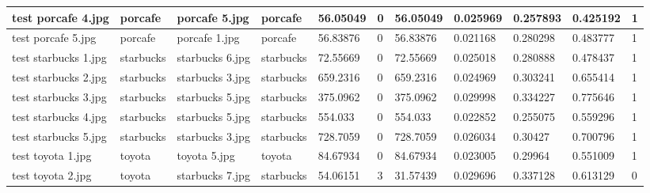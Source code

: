 \begin{landscape}
\begin{longtable}{|p{2cm}|p{1.5cm}|p{2cm}|p{1.5cm}|p{2cm}|p{1cm}|p{2cm}|p{2cm}|p{2cm}|p{2cm}|p{1cm}|}
		test porcafe 4.jpg   & porcafe          & porcafe 5.jpg         & porcafe                     & 56.05049              & 0                       & 56.05049                   & 0.025969              & 0.257893              & 0.425192                 & 1                \\ \hline
		test porcafe 5.jpg   & porcafe          & porcafe 1.jpg         & porcafe                     & 56.83876              & 0                       & 56.83876                   & 0.021168              & 0.280298              & 0.483777                 & 1                \\ \hline
		test starbucks 1.jpg & starbucks        & starbucks 6.jpg       & starbucks                   & 72.55669              & 0                       & 72.55669                   & 0.025018              & 0.280888              & 0.478437                 & 1                \\ \hline
		test starbucks 2.jpg & starbucks        & starbucks 3.jpg       & starbucks                   & 659.2316              & 0                       & 659.2316                   & 0.024969              & 0.303241              & 0.655414                 & 1                \\ \hline
		test starbucks 3.jpg & starbucks        & starbucks 5.jpg       & starbucks                   & 375.0962              & 0                       & 375.0962                   & 0.029998              & 0.334227              & 0.775646                 & 1                \\ \hline
		test starbucks 4.jpg & starbucks        & starbucks 5.jpg       & starbucks                   & 554.033               & 0                       & 554.033                    & 0.022852              & 0.255075              & 0.559296                 & 1                \\ \hline
		test starbucks 5.jpg & starbucks        & starbucks 3.jpg       & starbucks                   & 728.7059              & 0                       & 728.7059                   & 0.026034              & 0.30427               & 0.700796                 & 1                \\ \hline
		test toyota 1.jpg    & toyota           & toyota 5.jpg          & toyota                      & 84.67934              & 0                       & 84.67934                   & 0.023005              & 0.29964               & 0.551009                 & 1                \\ \hline
		test toyota 2.jpg    & toyota           & starbucks 7.jpg       & starbucks                   & 54.06151              & 3                       & 31.57439                   & 0.029696              & 0.337128              & 0.613129                 & 0                \\ \hline

\end{longtable}
\end{landscape}
